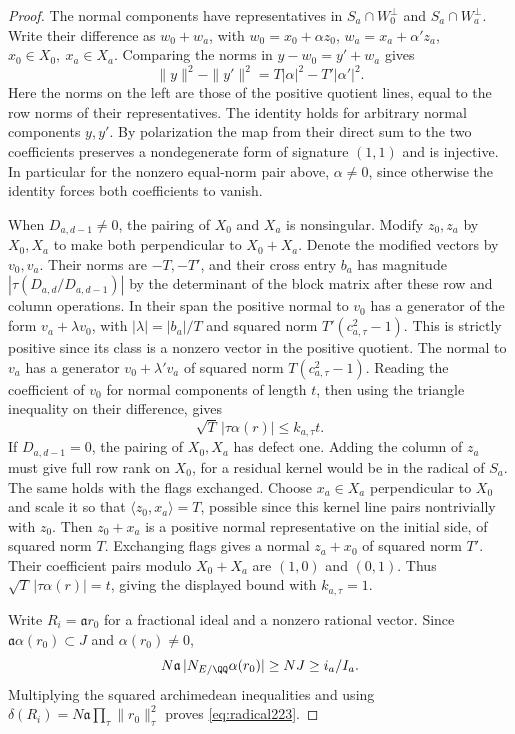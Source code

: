 \documentclass[a4paper,11pt]{article}
\theoremstyle{definition}
\theoremstyle{remark}
\numberwithin{equation}{section}
\begin{document}
\begin{proof}
The normal components have representatives in
\(S_a\cap W_0^\perp\) and \(S_a\cap W_a^\perp\). Write their
difference as \(w_0+w_a\), with
\(w_0=x_0+\alpha z_0\), \(w_a=x_a+\alpha'z_a\),
\(x_0\in X_0,\ x_a\in X_a\). Comparing the norms in
\(y-w_0=y'+w_a\) gives
\[
       \|y\|^2-\|y'\|^2=T|\alpha|^2-T'|\alpha'|^2.
\]
Here the norms on the left are those of the positive quotient
lines, equal to the row norms of their representatives.
The identity holds for arbitrary normal components \(y,y'\).
By polarization the map from their direct sum to the two
coefficients preserves a nondegenerate form of signature
\((1,1)\) and is injective. In particular for the nonzero
equal-norm pair above, \(\alpha\ne0\), since otherwise the
identity forces both coefficients to vanish.

When \(D_{a,d-1}\ne0\), the pairing of \(X_0\) and \(X_a\)
is nonsingular. Modify \(z_0,z_a\) by \(X_0,X_a\) to make
both perpendicular to \(X_0+X_a\). Denote the modified
vectors by \(v_0,v_a\). Their norms are \(-T,-T'\), and
their cross entry \(b_a\) has magnitude
\(|\tau(D_{a,d}/D_{a,d-1})|\) by the determinant of the
block matrix after these row and column operations. In
their span the positive normal to \(v_0\) has a generator
of the form \(v_a+\lambda v_0\), with \(|\lambda|=|b_a|/T\)
and squared norm \(T'(c_{a,\tau}^2-1)\). This is strictly
positive since its class is a nonzero vector in the positive
quotient. The normal to \(v_a\) has a generator
\(v_0+\lambda'v_a\) of squared norm \(T(c_{a,\tau}^2-1)\).
Reading the coefficient of \(v_0\) for normal components of
length \(t\), then using the triangle inequality on their
difference, gives
\[
                 \sqrt T\,|\tau\alpha(r)|
                          \le k_{a,\tau}t .
\]
If \(D_{a,d-1}=0\), the pairing of \(X_0,X_a\) has defect
one. Adding the column of \(z_a\) must give full row rank
on \(X_0\), for a residual kernel would be in the radical
of \(S_a\). The same holds with the flags exchanged.
Choose \(x_a\in X_a\) perpendicular to \(X_0\) and scale
it so that \(\langle z_0,x_a\rangle=T\), possible since
this kernel line pairs nontrivially with \(z_0\). Then
\(z_0+x_a\) is a positive normal representative on the
initial side, of squared norm \(T\). Exchanging flags gives
a normal \(z_a+x_0\) of squared norm \(T'\). Their coefficient
pairs modulo \(X_0+X_a\) are \((1,0)\) and \((0,1)\).
Thus \(\sqrt T\,|\tau\alpha(r)|=t\), giving the displayed
bound with \(k_{a,\tau}=1\).

Write \(R_i=\mathfrak a r_0\) for a fractional ideal and a
nonzero rational vector. Since \(\mathfrak a\alpha(r_0)
\subset J\) and \(\alpha(r_0)\ne0\),
\[
     N\mathfrak a\,|N_{E/\QQ}\alpha(r_0)|
                          \ge NJ\ge i_a/I_a .
\]
Multiplying the squared archimedean inequalities and using
\(\delta(R_i)=N\mathfrak a\prod_\tau\|r_0\|_\tau^2\)
proves \eqref{eq:radical223}.
\end{proof}
\end{document}
